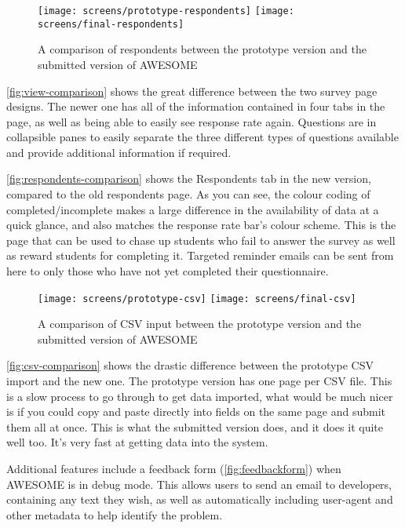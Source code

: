 	\begin{figure}[H]
		\texttt{[image: screens/prototype-respondents]}
		\texttt{[image: screens/final-respondents]}
		\caption{A comparison of respondents between the prototype version and the submitted version of \acs{AWESOME}}
		\label{fig:respondents-comparison}
	\end{figure}
		
	\autoref{fig:view-comparison} shows the great difference between the two survey page designs.
	The newer one has all of the information contained in four tabs in the page, as well as being able to easily see response rate again.
	Questions are in collapsible panes to easily separate the three different types of questions available and provide additional information if required.
	
	\autoref{fig:respondents-comparison} shows the Respondents tab in the new version, compared to the old respondents page.
	As you can see, the colour coding of completed/incomplete makes a large difference in the availability of data at a quick glance, and also matches the response rate bar's colour scheme.
	This is the page that can be used to chase up students who fail to answer the survey as well as reward students for completing it.
	Targeted reminder emails can be sent from here to only those who have not yet completed their questionnaire.
	
	\begin{figure}[H]
		\texttt{[image: screens/prototype-csv]}
		\texttt{[image: screens/final-csv]}
		\caption{A comparison of CSV input between the prototype version and the submitted version of \acs{AWESOME}}
		\label{fig:csv-comparison}
	\end{figure}
	
	\autoref{fig:csv-comparison} shows the drastic difference between the prototype CSV import and the new one.
	The prototype version has one page per CSV file.
	This is a slow process to go through to get data imported, what would be much nicer is if you could copy and paste directly into fields on the same page and submit them all at once.
	This is what the submitted version does, and it does it quite well too.
	It's very fast at getting data into the system.
	
	Additional features include a feedback form (\autoref{fig:feedbackform}) when \ac{AWESOME} is in debug mode.
	This allows users to send an email to developers, containing any text they wish, as well as automatically including user-agent and other metadata to help identify the problem.
	
